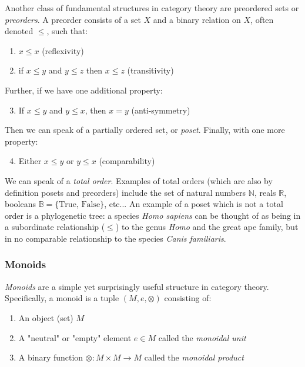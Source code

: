 \documentclass[12pt,a4paper]{article}
\begin{document}
Another class of fundamental structures in category theory are preordered sets or \textit{preorders}. A preorder consists of a set $X$ and a binary relation on $X$, often denoted $\leq$, such that:

\begin{enumerate}
\item $x \leq x$ (reflexivity)
\item if $x \leq y$ and $y \leq z$ then $x \leq z$ (transitivity)
\end{enumerate}

Further, if we have one additional property:

\begin{enumerate}
\setcounter{enumi}{2}
\item If $x \leq y$ and $y \leq x$, then $x = y$ (anti-symmetry)
\end{enumerate}

Then we can speak of a partially ordered set, or \textit{poset}. Finally, with one more property:

\begin{enumerate}
\setcounter{enumi}{3}
\item Either $x \leq y$ or $y \leq x$ (comparability)
\end{enumerate}

We can speak of a \textit{total order}. Examples of total orders (which are also by definition posets and preorders) include the set of natural numbers $\mathbb{N}$, reals $\mathbb{R}$, booleans $\mathbb{B} = \{ \text{True, False} \}$, etc... An example of a poset which is not a total order is a phylogenetic tree: a species \textit{Homo sapiens} can be thought of as being in a subordinate relationship ($\leq$) to the genus \textit{Homo} and the great ape family, but in no comparable relationship to the species \textit{Canis familiaris}.

\subsubsection{Monoids}

\textit{Monoids} are a simple yet surprisingly useful structure in category theory. Specifically, a monoid is a tuple $(M, e, \otimes)$ consisting of:

\begin{enumerate}
\item An object (set) $M$
\item A "neutral" or "empty" element $e \in M$ called the \textit{monoidal unit}
\item A binary function $\otimes: M \times M \to M$ called the \textit{monoidal product}
\end{enumerate}
\end{document}
